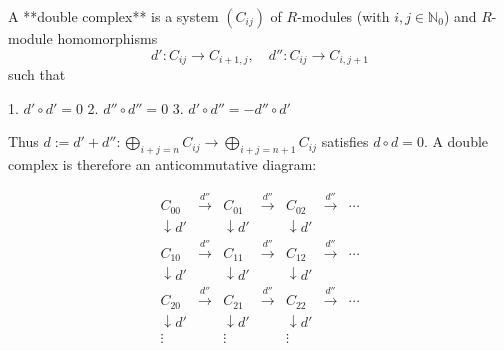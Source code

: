 A **double complex** is a system $(C_{ij})$ of $R$-modules (with $i, j \in \mathbb{N}_0$) and $R$-module homomorphisms
$$d' : C_{ij} \rightarrow C_{i+1,j}, \quad d'' : C_{ij} \rightarrow C_{i,j+1}$$
such that

1. $d' \circ d' = 0$
2. $d'' \circ d'' = 0$
3. $d' \circ d'' = -d'' \circ d'$

Thus $d := d' + d'' : \bigoplus_{i+j=n} C_{ij} \rightarrow \bigoplus_{i+j=n+1} C_{ij}$ satisfies $d \circ d = 0$. A double complex is therefore an anticommutative diagram:

$$\begin{array}{cccccc}
C_{00} & \xrightarrow{d''} & C_{01} & \xrightarrow{d''} & C_{02} & \xrightarrow{d''} & \cdots \\
\downarrow d' & & \downarrow d' & & \downarrow d' \\
C_{10} & \xrightarrow{d''} & C_{11} & \xrightarrow{d''} & C_{12} & \xrightarrow{d''} & \cdots \\
\downarrow d' & & \downarrow d' & & \downarrow d' \\
C_{20} & \xrightarrow{d''} & C_{21} & \xrightarrow{d''} & C_{22} & \xrightarrow{d''} & \cdots \\
\downarrow d' & & \downarrow d' & & \downarrow d' \\
\vdots & & \vdots & & \vdots
\end{array}$$
